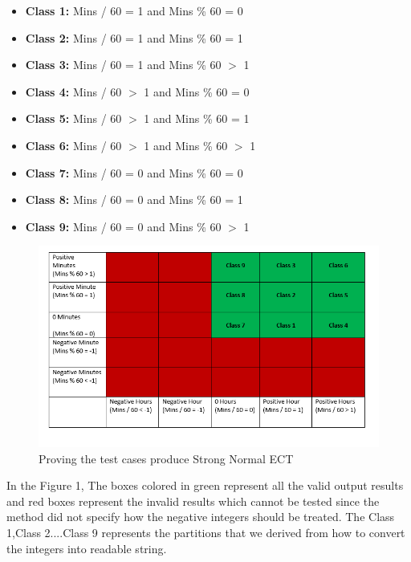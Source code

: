 \documentclass[fontsize=12pt,paper=letter,twoside]{scrartcl}
\begin{document}
\begin{itemize}
 \begin{itemize}
\item \textbf{Class 1:} Mins / 60 = 1 and Mins \% 60 = 0 
\item \textbf{Class 2:}  Mins / 60 = 1 and Mins \% 60 = 1
\item \textbf{Class 3:} Mins / 60 = 1 and Mins \% 60  $>$  1
\item \textbf{Class 4:} Mins / 60 $>$ 1 and Mins \% 60 = 0
\item \textbf{Class 5:} Mins / 60 $>$ 1 and Mins \% 60 = 1
\item \textbf{Class 6:} Mins / 60 $>$ 1 and Mins \% 60 $>$ 1
\item \textbf{Class 7:} Mins / 60 = 0 and Mins \% 60 = 0
\item \textbf{Class 8:} Mins / 60 = 0 and Mins \% 60 = 1
\item \textbf{Class 9:} Mins / 60 = 0 and Mins \% 60 $>$ 1
\end{itemize}
\begin{figure}[!htb]
\begin{center}
\includegraphics[width=.99\textwidth]{images/bbt/bbtmatrix.png}
\end{center}
\caption{Proving the test cases produce Strong Normal ECT}
\label{fig:bbt_matrix}
\end{figure}
In the Figure 1, The boxes colored in green represent all the valid output results and red boxes represent the invalid results which cannot be tested since the method did not specify how the negative integers should be treated. The Class 1,Class 2....Class 9 represents the partitions that we derived from how to convert the integers into readable string.


\end{itemize}
\end{document}
